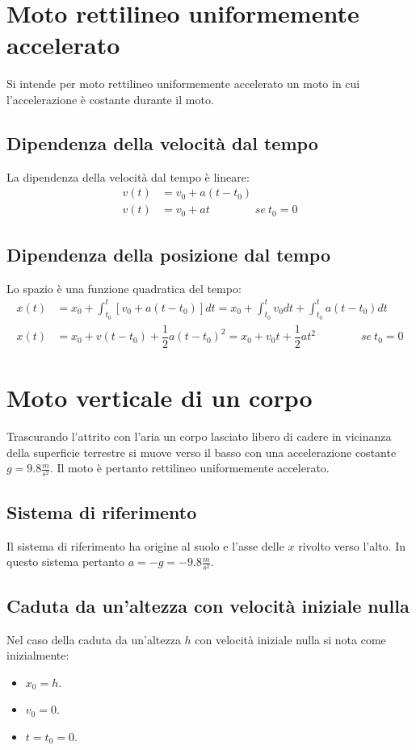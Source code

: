 \documentclass[class=book, crop=false, oneside, 12pt]{standalone}
\begin{document}
\section{Moto rettilineo uniformemente accelerato}
Si intende per moto rettilineo uniformemente accelerato un moto in cui l'accelerazione \`e costante durante il moto.
  \subsection{Dipendenza della velocit\`a dal tempo}
	La dipendenza della velocit\`a dal tempo \`e lineare:
	\begin{align*}
	  v(t) &=v_0+a(t-t_0)\\
		v(t) &=v_0+at\qquad\qquad se\ t_0 = 0
	\end{align*}
	\subsection{Dipendenza della posizione dal tempo}
	Lo spazio \`e una funzione quadratica del tempo:
	\begin{align*}
		x(t) &= x_0 +\int_{t_0}^t [v_0 + a(t-t_0)]dt= x_0 + \int_{t_0}^t v_0dt + \int_{t_0}^t a(t-t_0)dt\\
	  x(t) &= x_0 + v(t-t_0) +\dfrac{1}{2}a(t-t_0)^2= x_0 + v_0t +\dfrac{1}{2}at^2\qquad\qquad se\ t_0 = 0
	\end{align*}
\section{Moto verticale di un corpo}
Trascurando l'attrito con l'aria un corpo lasciato libero di cadere in vicinanza della superficie terrestre si muove verso il basso con una accelerazione costante $g=9.8\frac{m}{s^2}$.
Il moto \`e pertanto rettilineo uniformemente accelerato.
	\subsection{Sistema di riferimento}
	Il sistema di riferimento ha origine al suolo e l'asse delle $x$ rivolto verso l'alto.
	In questo sistema pertanto $a=-g=-9.8\frac{m}{s^2}$.
	\subsection{Caduta da un'altezza con velocit\`a iniziale nulla}
	Nel caso della caduta da un'altezza $h$ con velocit\`a iniziale nulla si nota come inizialmente:
	\begin{multicols}{3}
		\begin{itemize}
			\item $x_0 = h$.
			\item $v_0 = 0$.
			\item $t = t_0 = 0$.
		\end{itemize}
	\end{multicols}
\end{document}
